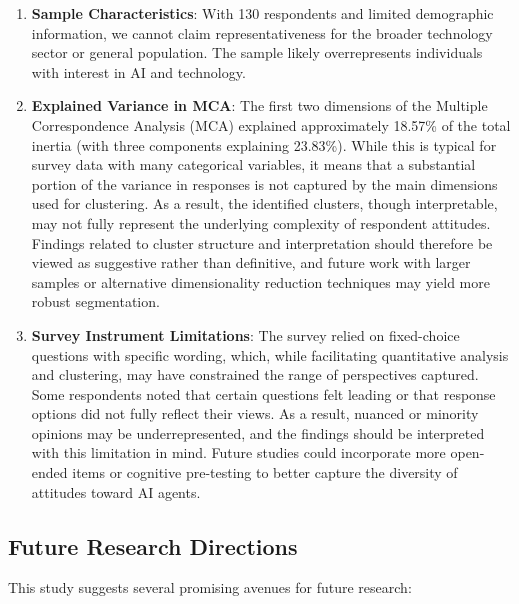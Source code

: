 \documentclass{article}
\providecommand{\tightlist}{%
  \setlength{\itemsep}{0pt}%
  \setlength{\parskip}{0pt}}
\begin{document}
\begin{enumerate}
	\tightlist
	\def\labelenumi{\arabic{enumi}.}
	\item
	      \textbf{Sample Characteristics}: With 130 respondents and limited
	      demographic information, we cannot claim representativeness for the
	      broader technology sector or general population. The sample likely
	      overrepresents individuals with interest in AI and technology.
	\item
	      \textbf{Explained Variance in MCA}: The first two dimensions of the
	      Multiple Correspondence Analysis (MCA) explained approximately 18.57\% of
	      the total inertia (with three components explaining 23.83\%).
	      While this is typical for survey data with many
	      categorical variables, it means that a substantial portion of the
	      variance in responses is not captured by the main dimensions used for
	      clustering. As a result, the identified clusters, though
	      interpretable, may not fully represent the underlying complexity of
	      respondent attitudes. Findings related to cluster structure and
	      interpretation should therefore be viewed as suggestive rather than
	      definitive, and future work with larger samples or alternative
	      dimensionality reduction techniques may yield more robust
	      segmentation.
	\item
	      \textbf{Survey Instrument Limitations}: The survey relied on
	      fixed-choice questions with specific wording, which, while
	      facilitating quantitative analysis and clustering, may have
	      constrained the range of perspectives captured. Some respondents noted
	      that certain questions felt leading or that response options did not
	      fully reflect their views. As a result, nuanced or minority opinions
	      may be underrepresented, and the findings should be interpreted with
	      this limitation in mind. Future studies could incorporate more
	      open-ended items or cognitive pre-testing to better capture the
	      diversity of attitudes toward AI agents.
\end{enumerate}

\subsection{Future Research
	Directions}\label{future-research-directions}

This study suggests several promising avenues for future research:
\end{document}
